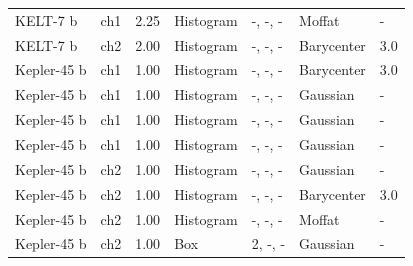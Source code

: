 \begin{subappendices}
{\begin{landscape}
\begin{longtable}{lllllll}
  KELT-7 b   &     ch1 &           2.25 &         Histogram &  -, -, - &             Moffat &                 - \\
  KELT-7 b   &     ch2 &           2.00 &         Histogram &  -, -, - &         Barycenter &                 3.0 \\
  Kepler-45 b &     ch1 &           1.00 &         Histogram &   -, -, -  &         Barycenter &                 3.0 \\
  Kepler-45 b &     ch1 &           1.00 &         Histogram &   -, -, -  &           Gaussian &                 - \\
  Kepler-45 b &     ch1 &           1.00 &         Histogram &   -, -, -  &           Gaussian &                 - \\
  Kepler-45 b &     ch1 &           1.00 &         Histogram &   -, -, -  &           Gaussian &                 - \\
  Kepler-45 b &     ch2 &           1.00 &         Histogram &   -, -, -  &           Gaussian &                 - \\
  Kepler-45 b &     ch2 &           1.00 &         Histogram &   -, -, -  &         Barycenter &                 3.0 \\
  Kepler-45 b &     ch2 &           1.00 &         Histogram &   -, -, -  &             Moffat &                 - \\
  Kepler-45 b &     ch2 &           1.00 &               Box &      2, -, -  &           Gaussian &                 - \\
  \end{longtable}
  \end{landscape}
  }


\end{subappendices}
